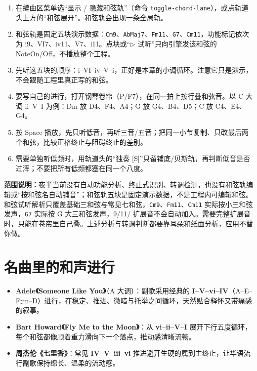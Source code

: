 \begin{enumerate}
  \item 在编曲区菜单选“显示 / 隐藏和弦轨”（命令 \texttt{toggle-chord-lane}），或点轨道头上方的“和弦展开”。和弦轨会出现一条全局轨。
  \item 和弦轨是固定五块演示数据：\texttt{Cm9}、\texttt{AbMaj7}、\texttt{Fm11}、\texttt{G7}、\texttt{Cm11}，功能标记依次为 i9、VI7、iv11、V7、i11。点块或“\ensuremath{\triangleright} 试听”只向引擎发该和弦的 NoteOn/Off，不播放整个工程。
  \item 先听这五块的顺序：i–VI–iv–V–i，正好是本章的小调循环。注意它只是演示，不会跟随工程里真正写的和弦。
  \item 要写自己的进行，打开钢琴卷帘（P/F7），在同一拍上按行叠和弦音。以 C 大调 ii–V–I 为例：Dm 放 D4、F4、A4；G 放 G4、B4、D5；C 放 C4、E4、G4。
  \item 按 Space 播放，先只听低音，再听三音/五音；把同一小节复制、只改最后两个和弦，比较正格终止与阻碍终止的差别。
  \item 需要单独听低频时，用轨道头的“独奏 [S]”只留铺底/贝斯轨，再判断低音是否过浑；不要把所有低频都塞在同一个八度。
\end{enumerate}


\textbf{范围说明：}夜半当前没有自动功能分析、终止式识别、转调检测，也没有和弦轨编辑或“按和弦名自动铺音”；和弦轨五块是固定演示数据，不是工程内可编辑和弦。和弦试听解析只覆盖基础三和弦与常见七和弦，\texttt{Cm9}、\texttt{Fm11}、\texttt{Cm11} 实际按小三和弦发声，\texttt{G7} 实际按 G 大三和弦发声，9/11/ 扩展音不会自动加入。需要完整扩展音时，只能在卷帘里自己叠。上述分析与转调判断都要靠耳朵和纸面分析，应用不替你做。

\section{名曲里的和声进行}

\begin{itemize}
  \item \textbf{Adele《Someone Like You》}（A 大调）：副歌采用经典的 \textbf{I--V--vi--IV}（A--E--F$\sharp$m--D）进行，在稳定、推进、微暗与托举之间循环，天然贴合释怀又带痛感的叙事。
  \item \textbf{Bart Howard《Fly Me to the Moon》}：从 \textbf{vi--ii--V--I} 展开下行五度循环，每个和弦都像顺着重力滑向下一个落点，推动感清晰流畅。
  \item \textbf{周杰伦《七里香》}：常见 \textbf{IV--V--iii--vi} 推进避开生硬的属到主终止，让华语流行副歌保持绵长、温柔的流动感。
\end{itemize}

